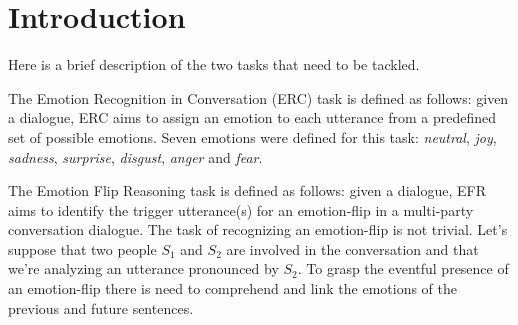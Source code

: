 \documentclass[11pt,table,xcdraw]{article}
\begin{document}


\section{Introduction}
\label{sec:introduction}
Here is a brief description of the two tasks that need to be tackled. 

The Emotion Recognition in Conversation (ERC) task is defined as follows: given a dialogue, ERC aims to assign an emotion to each utterance from a predefined set of possible emotions. Seven emotions were defined for this task: \textit{neutral}, \textit{joy}, \textit{sadness}, \textit{surprise}, \textit{disgust}, \textit{anger} and \textit{fear}.

The Emotion Flip Reasoning task is defined as follows: given a dialogue, EFR aims to identify the trigger utterance(s) for an emotion-flip in a multi-party conversation dialogue. The task of recognizing an emotion-flip is not trivial. Let's suppose that two people $S_1$ and $S_2$ are involved in the conversation and that we're analyzing an utterance pronounced by $S_2$. To grasp the eventful presence of an emotion-flip there is need to comprehend and link the emotions of the previous and future sentences.
\end{document}
